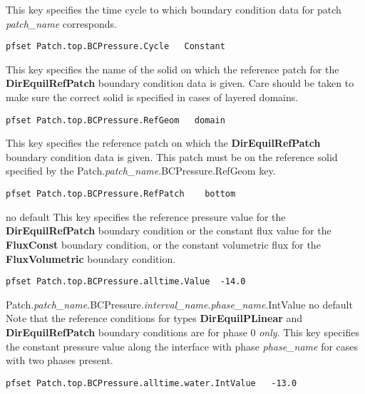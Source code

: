 {This key specifies the time cycle to which boundary condition data for patch
{\em patch\_name} corresponds. 
}
\begin{display}\begin{verbatim}
pfset Patch.top.BCPressure.Cycle   Constant
\end{verbatim}\end{display}

{This key specifies the name of the solid on which the reference patch for the
{\bf DirEquilRefPatch} boundary condition data is given.
Care should be taken to
make sure the correct solid is specified in cases of layered domains.  
}
\begin{display}\begin{verbatim}
pfset Patch.top.BCPressure.RefGeom   domain
\end{verbatim}\end{display}

{This key specifies the reference patch on which the 
{\bf DirEquilRefPatch} boundary condition data is given.  This patch must be on
the reference solid specified by the Patch.{\em patch\_name}.BCPressure.RefGeom
key.
}
\begin{display}\begin{verbatim}
pfset Patch.top.BCPressure.RefPatch    bottom
\end{verbatim}\end{display}

{no default}
{This key specifies the reference pressure value for the 
{\bf DirEquilRefPatch} boundary condition or the constant flux value for the
{\bf FluxConst} boundary condition, or the constant volumetric flux for the
{\bf FluxVolumetric} boundary condition.
}
\begin{display}\begin{verbatim}
pfset Patch.top.BCPressure.alltime.Value  -14.0
\end{verbatim}\end{display}

{Patch.{\em patch\_name}.BCPressure.{\em interval\_name}.{\em phase\_name}.IntValue}
{no default}
{Note that the reference conditions for types {\bf DirEquilPLinear} and 
{\bf DirEquilRefPatch}
boundary conditions are for phase 0 {\em only}.  
This key specifies the constant pressure value
along the interface with phase {\em phase\_name} for cases with two phases
present.
}
\begin{display}\begin{verbatim}
pfset Patch.top.BCPressure.alltime.water.IntValue   -13.0
\end{verbatim}\end{display}

